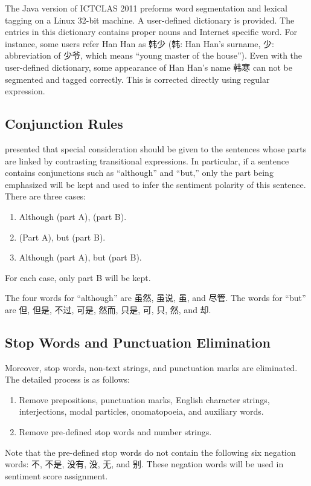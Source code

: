 \documentclass[11pt]{article}
\newcommand{\1}[1]{{\mathbf 1}\left\{#1\right\}}        %
\begin{document}
The Java version of ICTCLAS 2011 preforms word segmentation and lexical tagging on a Linux 32-bit machine. A user-defined dictionary is provided. The entries in this dictionary contains proper nouns and Internet specific word. For instance, some users refer Han Han as 韩少 (韩: Han Han's surname, 少: abbreviation of 少爷, which means ``young master of the house''). 
Even with the user-defined dictionary, some appearance of Han Han's name 韩寒 can not be segmented and tagged correctly. This is corrected directly using regular expression.

\subsection{Conjunction Rules}

\cite{lee2011chinese} presented that special consideration should be given to the sentences whose parts are linked by contrasting transitional expressions. In particular, if a sentence contains conjunctions such as ``although'' and  ``but,'' only the part being emphasized will be kept and used to infer the sentiment polarity of this sentence. There are three cases:
\begin{enumerate}
\item Although (part A), (part B).
\item (Part A), but (part B).
\item Although (part A), but (part B).
\end{enumerate}
For each case, only part B will be kept. 

The four words for ``although'' are 虽然, 虽说, 虽, and 尽管. The words for ``but'' are 但, 但是, 不过, 可是, 然而, 只是, 可, 只, 然, and 却. 



\subsection{Stop Words and Punctuation Elimination}
Moreover, stop words, non-text strings, and punctuation marks are eliminated. The detailed process is as follows: 
\begin{enumerate}
\item  Remove prepositions, punctuation marks, English character strings, interjections, modal particles, onomatopoeia, and auxiliary words.
\item Remove pre-defined stop words and number strings.
\end{enumerate}
Note that the pre-defined stop words do not contain the following six negation words:  不, 不是, 没有, 没, 无, and 别. These negation words will be used in sentiment score assignment.
\end{document}
